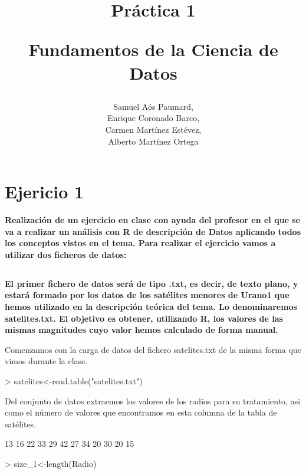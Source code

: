 \documentclass[a4paper]{article}
\title{ Práctica 1 \\
\begin{large}
     Fundamentos de la Ciencia de Datos
\end{large}
}
\author{Samuel Aós Paumard,\\
Enrique Coronado Barco,\\
Carmen Martínez Estévez,\\
Alberto Martínez Ortega}
\begin{document}
\maketitle

\section{Ejericio 1}
\textbf{Realización de un ejercicio en clase con ayuda del profesor en el que se va a realizar un análisis con R de descripción de Datos aplicando todos los conceptos vistos en el tema. Para realizar el ejercicio vamos a utilizar dos ficheros de datos:}
\subsection{}
\textbf{El primer fichero de datos será de tipo .txt, es decir, de texto plano, y estará formado por los datos de los satélites menores de Urano1 que hemos utilizado en la descripción teórica del tema. Lo denominaremos satelites.txt. El objetivo es obtener, utilizando R, los valores de las mismas magnitudes cuyo valor hemos calculado de forma manual.}

Comenzamos con la carga de datos del fichero satelites.txt de la misma forma que vimos durante la clase.
\begin{Schunk}
\begin{Sinput}
> satelites<-read.table("satelites.txt")
\end{Sinput}
\end{Schunk}

Del conjunto de datos extraemos los valores de los radios para su tratamiento, asi como el número de valores que encontramos en esta columna de la tabla de satélites.
\begin{Schunk}
\begin{Soutput}
 [1] 13 16 22 33 29 42 27 34 20 30 20 15
\end{Soutput}
\begin{Sinput}
> size_1<-length(Radio)
\end{Sinput}
\end{Schunk}
\end{document}
